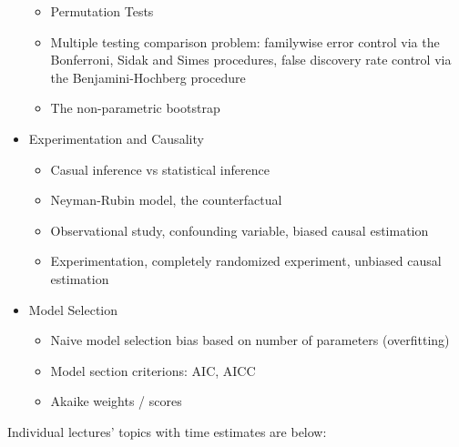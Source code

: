 \documentclass[12pt]{article}
\begin{document}
\begin{itemize}
\begin{itemize}
\item Permutation Tests
\item Multiple testing comparison problem: familywise error control via the Bonferroni, Sidak and Simes procedures, false discovery rate control via the Benjamini-Hochberg procedure
\item The non-parametric bootstrap
\end{itemize}
\item Experimentation and Causality
\begin{itemize}
\item Casual inference vs statistical inference
\item Neyman-Rubin model, the counterfactual
\item Observational study, confounding variable, biased causal estimation
\item Experimentation, completely randomized experiment, unbiased causal estimation
\end{itemize}
\item Model Selection
\begin{itemize}
\item Naive model selection bias based on number of parameters (overfitting)
\item Model section criterions: AIC, AICC
\item Akaike weights / scores
\end{itemize}
\end{itemize}

Individual lectures' topics with time estimates are below:
\end{document}

